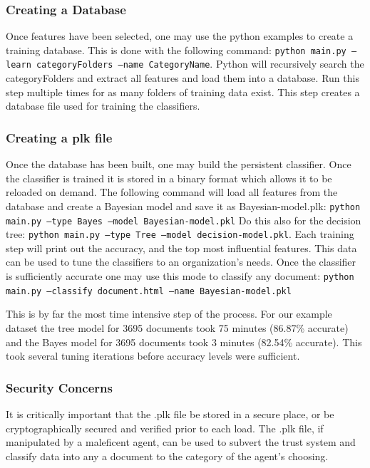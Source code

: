 \subsubsection{Creating a Database}
Once features have been selected, one may use the python examples to create
a training database. This is done with the following command: 
\texttt{python main.py --learn categoryFolders --name CategoryName}. Python
will recursively search the categoryFolders and extract all features and load
them into a database. Run this step multiple times for as many folders of
training data exist. This step creates a database file used for training the
classifiers.

\subsubsection{Creating a plk file}
Once the database has been built, one may build the persistent classifier. Once
the classifier is trained it is stored in a binary format which allows it to
be reloaded on demand. The following command will load all features from the
database and create a Bayesian model and save it as Bayesian-model.plk: 
\texttt{python main.py --type Bayes --model Bayesian-model.pkl}
Do this also for the decision tree: \texttt{python main.py --type Tree --model
decision-model.pkl}. Each training step will print out the accuracy, and the top
most influential features. This data can be used to tune the classifiers to an organization's needs.
Once the classifier is sufficiently accurate one may use this mode to classify
any document: \texttt{python main.py --classify document.html --name Bayesian-model.pkl}

This is by far the most time intensive step of the process. For our example dataset the tree
model for 3695 documents took 75 minutes (86.87\% accurate) and the Bayes
model for 3695 documents took 3 minutes (82.54\% accurate). This took several
tuning iterations before accuracy levels were sufficient. 

\subsubsection{Security Concerns}
It is critically important that the .plk file be stored in a secure place, or be
cryptographically secured and verified prior to each load. The .plk file, if
manipulated by a maleficent agent, can be used to subvert the trust system and
classify data into any a document to the category of the agent's choosing.  



